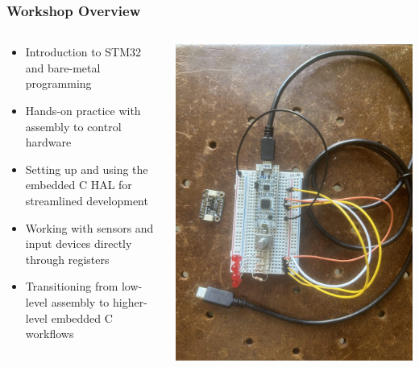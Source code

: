 \documentclass{beamer}
\begin{document}
\begin{frame}
    \frametitle{Workshop Overview}
    \begin{columns}
        \begin{column}{0.55\textwidth}
            \begin{itemize}
                \item Introduction to STM32 and bare-metal programming
                \item Hands-on practice with assembly to control hardware
                \item Setting up and using the embedded C HAL for streamlined development
                \item Working with sensors and input devices directly through registers
                \item Transitioning from low-level assembly to higher-level embedded C workflows
            \end{itemize}
        \end{column}
        \begin{column}{0.4\textwidth}
            \begin{center}
                \includegraphics[width=\textwidth]{images/nuwc-advanced-embedded-workshop-overview.jpg} %
            \end{center}
        \end{column}
    \end{columns}
\end{frame}
\end{document}
